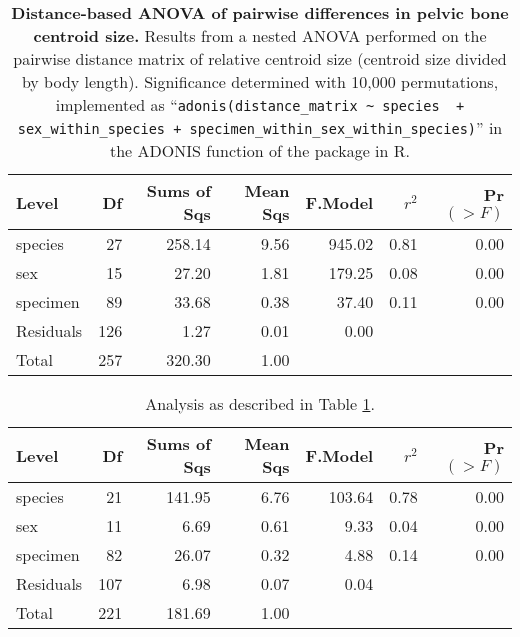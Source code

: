 

\begin{table}[ht]
\centering
\begin{tabular}{lrrrrrr}
  \hline
 Level & Df & Sums of Sqs & Mean Sqs & F.Model & $r^2$ & Pr$(>F)$ \\ 
  \hline
  species &  27 & 258.14 & 9.56 & 945.02 & 0.81 & 0.00 \\ 
  sex &  15 & 27.20 & 1.81 & 179.25 & 0.08 & 0.00 \\ 
  specimen &  89 & 33.68 & 0.38 & 37.40 & 0.11 & 0.00 \\ 
  Residuals & 126 & 1.27 & 0.01 & 0.00 &  &  \\ 
  Total & 257 & 320.30 & 1.00 &  &  &  \\ 
   \hline
\end{tabular}
\caption{
\textbf{Distance-based ANOVA of pairwise differences in pelvic bone centroid size.}  Results from a nested ANOVA performed on the pairwise distance matrix of relative centroid size (centroid size divided by body length).  Significance determined with 10,000 permutations, implemented as ``\lstinline{adonis(distance_matrix ~ species  + sex_within_species + specimen_within_sex_within_species)}'' in the ADONIS function of the \citet{oksanen2013} package in R. 
\label{stab:anova1}
}
\end{table}

\begin{table}[ht]
\centering
\begin{tabular}{lrrrrrr}
  \hline
 Level & Df & Sums of Sqs & Mean Sqs & F.Model & $r^2$ & Pr$(>F)$ \\ 
  \hline
  species &  21 & 141.95 & 6.76 & 103.64 & 0.78 & 0.00 \\ 
  sex &  11 & 6.69 & 0.61 & 9.33 & 0.04 & 0.00 \\ 
  specimen &  82 & 26.07 & 0.32 & 4.88 & 0.14 & 0.00 \\ 
  Residuals & 107 & 6.98 & 0.07 & 0.04 &  &  \\ 
  Total & 221 & 181.69 & 1.00 &  &  &  \\ 
   \hline
\end{tabular}
\caption{
Analysis as described in Table \ref{stab:anova1}.
}
\end{table}


